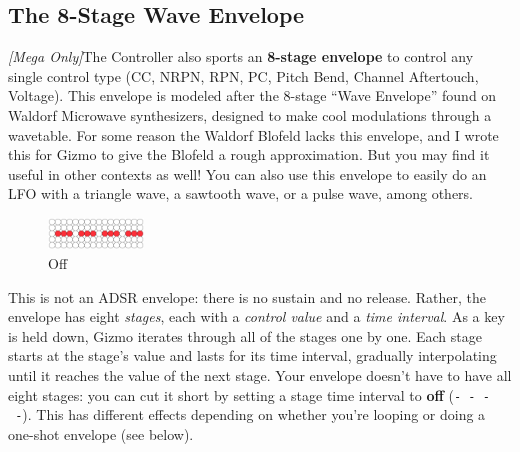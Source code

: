 \documentclass{article}
\begin{document}
\subsection{The 8-Stage Wave Envelope}
\label{waveenvelope}

\textit{[Mega Only]}\qquad The Controller also sports an {\bf 8-stage envelope} to control any single control type (CC, NRPN, RPN, PC, Pitch Bend, Channel Aftertouch, Voltage).  This envelope is modeled after the 8-stage ``Wave Envelope'' found on Waldorf Microwave synthesizers, designed to make cool modulations through a wavetable.  For some reason the Waldorf Blofeld lacks this envelope, and I wrote this for Gizmo to give the Blofeld a rough approximation.  But you may find it useful in other contexts as well!  You can also use this envelope to easily do an LFO with a triangle wave, a sawtooth wave, or a pulse wave, among others.

\begin{figure}
\includegraphics[width=1in]{none.pdf}
\vspace{-2em}\caption{\small Off}\vspace{-1em}
\end{figure}

 This is not an ADSR envelope: there is no sustain and no release.  Rather, the envelope has eight {\it stages}, each with a {\it control value} and a {\it time interval}.  As a key is held down, Gizmo iterates through all of the stages one by one.  Each stage starts at the stage's value and lasts for its time interval, gradually interpolating until it reaches the value of the next stage.  Your envelope doesn't have to have all eight stages: you can cut it short by setting a stage time interval to {\bf off} (\texttt{-~-~-~-}).  This has different effects depending on whether you're looping or doing a one-shot envelope (see below).
\end{document}
